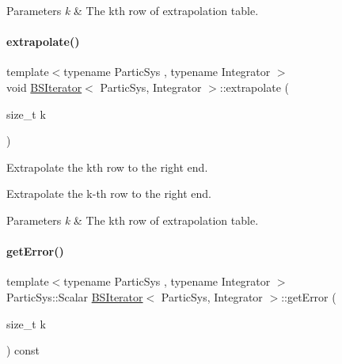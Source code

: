 \begin{DoxyParams}{Parameters}
{\em k} & The kth row of extrapolation table. \\
\hline
\end{DoxyParams}
\mbox{\label{class_b_s_iterator_ac1edf158e3dd05ed15afd5d0f31c121a}} 
\paragraph{\texorpdfstring{extrapolate()}{extrapolate()}}
{\footnotesize\ttfamily template$<$typename Partic\+Sys , typename Integrator $>$ \\
void \mbox{\hyperlink{class_b_s_iterator}{B\+S\+Iterator}}$<$ Partic\+Sys, Integrator $>$\+::extrapolate (\begin{DoxyParamCaption}\item[{size\+\_\+t}]{k }\end{DoxyParamCaption})\hspace{0.3cm}{\ttfamily [private]}}



Extrapolate the kth row to the right end. 

Extrapolate the k-\/th row to the right end.


\begin{DoxyParams}{Parameters}
{\em k} & The kth row of extrapolation table. \\
\hline
\end{DoxyParams}
\mbox{\label{class_b_s_iterator_a9f50e084f8650e4d7fea3535a0547139}} 
\paragraph{\texorpdfstring{get\+Error()}{getError()}}
{\footnotesize\ttfamily template$<$typename Partic\+Sys , typename Integrator $>$ \\
Partic\+Sys\+::\+Scalar \mbox{\hyperlink{class_b_s_iterator}{B\+S\+Iterator}}$<$ Partic\+Sys, Integrator $>$\+::get\+Error (\begin{DoxyParamCaption}\item[{size\+\_\+t}]{k }\end{DoxyParamCaption}) const\hspace{0.3cm}{\ttfamily [private]}}



